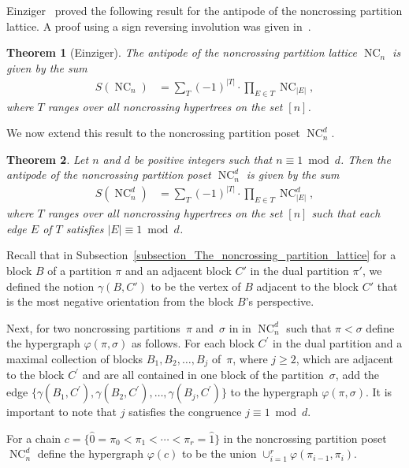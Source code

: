 \documentclass[11pt]{amsart}
\newtheorem{theorem}{Theorem}[section]
\numberwithin{equation}{section}
\newcommand{\hz}{\widehat{0}}
\newcommand{\ho}{\widehat{1}}
\DeclareMathOperator{\NC}{NC}
\begin{document}
Einziger~\cite{Einziger_dissertation,Einziger_preprint}
proved the following result for the antipode of the noncrossing partition lattice.
A proof using a sign reversing involution was given in~\cite{Ehrenborg_Happ}.

\begin{theorem}[Einziger]
The antipode of the noncrossing partition lattice $\NC_{n}$ is given by the sum
\begin{align*}
S(\NC_{n})
& =
\sum_{T}
(-1)^{|T|}
\cdot
\prod_{E \in T} \NC_{|E|} ,
\end{align*}
where $T$ ranges over all noncrossing hypertrees on the set $[n]$.
\end{theorem}

We now extend this result to the noncrossing partition poset $\NC^{d}_{n}$.

\begin{theorem}
Let $n$ and $d$ be positive integers such that $n \equiv 1 \bmod d$.
Then the antipode of the noncrossing partition poset $\NC^{d}_{n}$ is given by the sum
\begin{align*}
S(\NC^{d}_{n})
& =
\sum_{T}
(-1)^{|T|}
\cdot
\prod_{E \in T} \NC^{d}_{|E|} ,
\end{align*}
where $T$ ranges over all noncrossing hypertrees on the set $[n]$
such that each edge $E$ of $T$ satisfies $|E| \equiv 1 \bmod d$.
\label{theorem_antipode}
\end{theorem}

Recall that
in Subsection~\ref{subsection_The_noncrossing_partition_lattice}
for a block $B$ of a partition $\pi$ and
an adjacent block $C'$ in the dual partition $\pi'$, we defined the notion
$\gamma(B,C')$ to be the vertex of $B$ adjacent to the block $C'$
that is the most negative orientation from the block $B$'s perspective.

Next, for two noncrossing partitions~$\pi$ and~$\sigma$ in
in $\NC^{d}_{n}$ such that $\pi < \sigma$ define the
hypergraph $\varphi(\pi,\sigma)$ as follows.
For each block $C^{\prime}$ in the dual partition
and a maximal collection of blocks
$B_{1}, B_{2}, \ldots, B_{j}$ of~$\pi$, where $j \geq 2$,
which are adjacent to the block $C^{\prime}$
and are all contained in one block of the partition~$\sigma$, add
the edge
$\{\gamma(B_{1},C^{\prime}),\gamma(B_{2},C^{\prime}), \ldots, \gamma(B_{j},C^{\prime})\}$
to the hypergraph $\varphi(\pi,\sigma)$.
It is important to note that $j$ satisfies the congruence
$j \equiv 1 \bmod d$.

For a chain $c = \{\hz = \pi_{0} < \pi_{1} < \cdots < \pi_{r} = \ho\}$
in the noncrossing partition poset $\NC^{d}_{n}$
define the hypergraph $\varphi(c)$ to be the union
$\cup_{i=1}^{r} \varphi(\pi_{i-1},\pi_{i})$.
\end{document}
